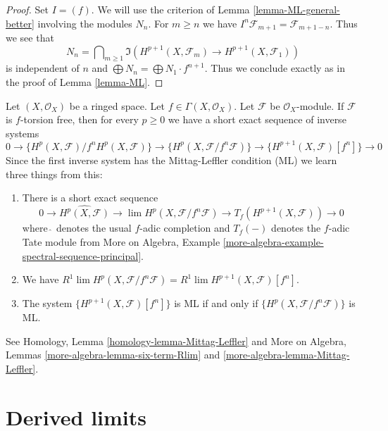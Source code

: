 \begin{proof}
Set $I = (f)$. We will use the criterion of Lemma \ref{lemma-ML-general-better}
involving the modules $N_n$. For $m \geq n$ we have
$I^n\mathcal{F}_{m + 1} = \mathcal{F}_{m + 1 - n}$. Thus we see that
$$
N_n = \bigcap\nolimits_{m \geq 1} \Im\left(
H^{p + 1}(X, \mathcal{F}_m) \to H^{p + 1}(X, \mathcal{F}_1)
\right)
$$
is independent of $n$ and
$\bigoplus N_n = \bigoplus N_1 \cdot f^{n + 1}$.
Thus we conclude exactly as in the proof of Lemma \ref{lemma-ML}.
\end{proof}

\begin{remark}
\label{remark-compare-ML}
Let $(X, \mathcal{O}_X)$ be a ringed space.
Let $f \in \Gamma(X, \mathcal{O}_X)$.
Let $\mathcal{F}$ be $\mathcal{O}_X$-module.
If $\mathcal{F}$ is $f$-torsion free, then for every $p \geq 0$
we have a short exact sequence of inverse systems
$$
0 \to \{H^p(X, \mathcal{F})/f^nH^p(X, \mathcal{F})\}
\to \{H^p(X, \mathcal{F}/f^n\mathcal{F})\}
\to \{H^{p + 1}(X, \mathcal{F})[f^n]\} \to 0
$$
Since the first inverse system has the Mittag-Leffler condition (ML)
we learn three things from this:
\begin{enumerate}
\item There is a short exact sequence
$$
0 \to \widehat{H^p(X, \mathcal{F})} \to
\lim H^p(X, \mathcal{F}/f^n\mathcal{F}) \to
T_f(H^{p + 1}(X, \mathcal{F})) \to 0
$$
where $\widehat{\ }$ denotes the usual $f$-adic completion and
$T_f( - )$ denotes the $f$-adic Tate module from
More on Algebra, Example
\ref{more-algebra-example-spectral-sequence-principal}.
\item We have
$R^1\lim H^p(X, \mathcal{F}/f^n\mathcal{F}) =
R^1\lim H^{p + 1}(X, \mathcal{F})[f^n]$.
\item The system $\{H^{p + 1}(X, \mathcal{F})[f^n]\}$ is ML if and only if
$\{H^p(X, \mathcal{F}/f^n\mathcal{F})\}$ is ML.
\end{enumerate}
See Homology, Lemma \ref{homology-lemma-Mittag-Leffler} and
More on Algebra, Lemmas \ref{more-algebra-lemma-six-term-Rlim} and
\ref{more-algebra-lemma-Mittag-Leffler}.
\end{remark}










\section{Derived limits}
\label{section-derived-limits}

